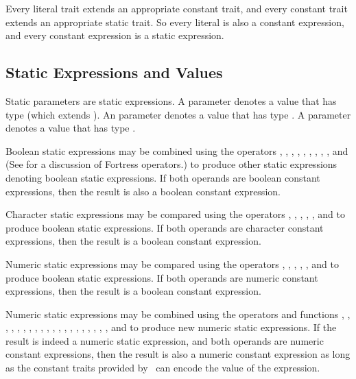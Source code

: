 Every literal trait extends an appropriate constant trait, and every
constant trait extends an appropriate static trait.  So every
literal is also a constant expression, and every constant expression
is a static expression.




\subsection{Static Expressions and Values}

Static parameters are static expressions.
A  parameter denotes a value that has type 
(which extends ).
An  parameter denotes a value that has type .
A  parameter denotes a value that has type .


Boolean static expressions may be combined using the operators
\EXP{\wedge}, \EXP{\vee}, \EXP{\oplus},
\EXP{\equiv}, \EXP{\leftrightarrow}, , , \EXP{=},
\EXP{\neq}, and \EXP{\rightarrow} (See  for a
discussion of Fortress operators.)
to produce other static expressions denoting boolean static expressions.
If both operands are boolean constant expressions, then the result is also
a boolean constant expression.

Character static expressions may be compared using the operators \EXP{<},
\EXP{\leq}, \EXP{\geq}, \EXP{>},
\EXP{=}, and \EXP{\neq} to produce boolean static expressions.  If both
operands are character constant expressions, then the result is a boolean
constant expression.

Numeric static expressions may be compared using the operators \EXP{<},
\EXP{\leq}, \EXP{\geq}, \EXP{>},
\EXP{=}, and \EXP{\neq} to produce boolean static expressions.  If both
operands are numeric constant expressions, then the result is a boolean
constant expression.

Numeric static expressions may be combined using the operators and
functions \EXP{+},
\EXP{-}, \EXP{\times}, \EXP{\cdot}, \EXP{/}, \EXP{!}, , ,
\EXP{\surd}, , ,
, , \EXP{\gcd}, , \EXP{\sin},
\EXP{\cos}, \EXP{\tan}, \EXP{\arcsin}, \EXP{\arccos}, and \EXP{\arctan}
to produce new numeric static expressions.  If the result is indeed
a numeric static expression, and both operands are numeric constant
expressions, then the result is also a numeric constant expression
as long as the constant traits provided by \library\ can encode the value
of the expression.
